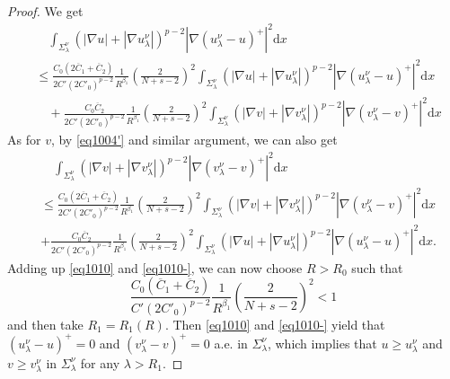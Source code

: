 \documentclass[12pt]{amsart}
\theoremstyle{definition}
\theoremstyle{remark}
\theoremstyle{conclusion}
\theoremstyle{conjecture}
\numberwithin{equation}{section}
\begin{document}
\begin{proof}
We get
\begin{align}\label{eq1010}
        &\quad \int_{\Sigma_\lambda^\nu}(|\nabla u|+|\nabla u^{\nu}_{\lambda}|)^{p-2} |\nabla (u^{\nu}_{\lambda}-u)^+|^2 \mathrm{d}x \\
        &\leq \frac{C_0(2\overline{C}_1+\overline{C}_2)}{2C'(2C'_0)^{p-2}} \frac{1}{R^{\beta_1}}
    \left(\frac{2}{N+s-2}\right)^2\int_{\Sigma_\lambda^\nu} (|\nabla u|+|\nabla u^{\nu}_{\lambda}|)^{p-2} |\nabla(u^{\nu}_{\lambda}-u )^+|^2 \mathrm{d}x \nonumber \\
    & \quad + \frac{ C_0\overline{C}_2}{2C'(2C'_0)^{p-2}} \frac{1}{R^{\beta_1}}
    \left(\frac{2}{N+s-2}\right)^2\int_{\Sigma_\lambda^\nu} (|\nabla v|+|\nabla v^{\nu}_{\lambda}|)^{p-2} |\nabla(v^{\nu}_{\lambda}-v )^+|^2 \mathrm{d}x \nonumber
\end{align}
As for $v$, by \eqref{eq1004'} and similar argument, we can also get
\begin{align}\label{eq1010-}
        &\quad \int_{\Sigma_\lambda^\nu}(|\nabla v|+|\nabla v^{\nu}_{\lambda}|)^{p-2} |\nabla (v^{\nu}_{\lambda}-v)^+|^2 \mathrm{d}x \\
        &\leq \frac{C_0(2\overline{C}_1+\overline{C}_2)}{2C'(2C'_0)^{p-2}}\frac{1}{R^{\beta_1}}\left(\frac{2}{N+s-2}\right)^2
        \int_{\Sigma_\lambda^\nu} (|\nabla v|+|\nabla v^{\nu}_{\lambda}|)^{p-2} |\nabla(v^{\nu}_{\lambda}-v )^+|^2 \mathrm{d}x  \nonumber\\
        & + \frac{ C_0\overline{C}_2}{2C'(2C'_0)^{p-2}} \frac{1}{R^{\beta_1}}\left(\frac{2}{N+s-2}\right)^2
        \int_{\Sigma_\lambda^\nu}(|\nabla u|+|\nabla u^{\nu}_{\lambda}|)^{p-2} |\nabla (u^{\nu}_{\lambda}-u)^+|^2 \mathrm{d}x.  \nonumber
\end{align}
Adding up \eqref{eq1010} and \eqref{eq1010-}, we can now choose $R > R_0$ such that
$$\frac{C_0(\overline{C}_1+\overline{C}_2)}{C'(2C'_0)^{p-2}} \frac{1}{R^{\beta_1}}\left(\frac{2}{N+s-2}\right)^2 <1$$
and then take $R_1 = R_1(R)$.  Then \eqref{eq1010} and \eqref{eq1010-} yield that $(u^{\nu}_{\lambda}-u)^+=0$ and $(v^{\nu}_{\lambda}-v)^+=0$ a.e. in $\Sigma_\lambda^\nu$, which implies that $u\geq u^{\nu}_{\lambda}$ and $v \geq v^\nu_\lambda$ in $\Sigma_\lambda^\nu$ for any $\lambda>R_1$.

\medskip


\end{proof}
\end{document}
